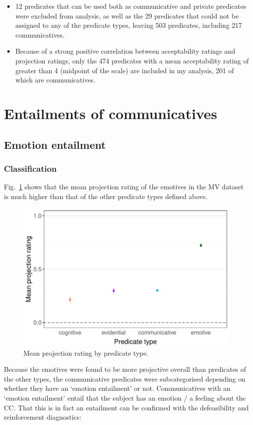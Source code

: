 \documentclass[11pt,fleqn]{article}
\newcommand{\figref}[1]{Fig.~\ref{#1}}
\newcommand{\6}{\mbox{$[\hspace*{-.6mm}[$}}
\newcommand{\9}{\mbox{$]\hspace*{-.6mm}]$}}
\begin{document}
\begin{itemize}
\begin{itemize}
	\end{itemize}
	\item 12 predicates that can be used both as communicative and private predicates were excluded from analysis, as well as the 29 predicates that could not be assigned to any of the predicate types, leaving 503 predicates, including 217 communicatives.
	\item Because of a strong positive correlation between acceptability ratings and projection ratings, only the 474 predicates with a mean acceptability rating of greater than 4 (midpoint of the scale) are included in my analysis, 201 of which are communicatives.
\end{itemize}

\section{Entailments of communicatives}
\subsection{Emotion entailment}
\subsubsection{Classification}
\figref{projpredtype} shows that the mean projection rating of the emotives in the MV dataset is much higher than that of the other predicate types defined above.

\begin{figure}[H]
	\centering
	\includegraphics[width=.6\textwidth]{projection-by-predicateType}
	\caption{Mean projection rating by predicate type.}
	\label{projpredtype}
\end{figure}

Because the emotives were found to be more projective overall than predicates of the other types, the communicative predicates were subcategorised depending on whether they have an ‘emotion entailment’ or not. Communicatives with an `emotion entailment' entail that the subject has an emotion / a feeling about the CC. That this is in fact an entailment can be confirmed with the defeasibility and reinforcement diagnostics:
\end{document}
